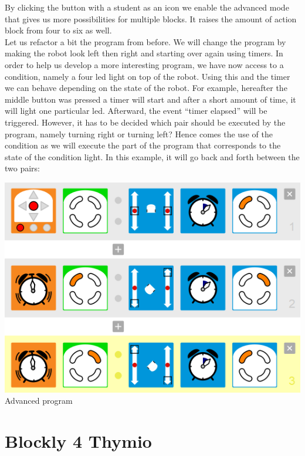 \documentclass{scrreprt}
\begin{document}
By clicking the button with a student as an icon we enable the advanced mode that gives us more possibilities for multiple blocks. It raises the amount of action block from four to six as well. \\

Let us refactor a bit the program from before. We will change the program by making the robot look left then right and starting over again using timers. 
In order to help us develop a more interesting program, we have now access to a condition, namely a four led light on top of the robot. Using this and the timer we can behave depending on the state of the robot. 
For example, hereafter the middle button was pressed a timer will start and after a short amount of time, it will light one particular led. 
Afterward, the event “timer elapsed” will be triggered. However, it has to be decided which pair should be executed by the program, namely turning right or turning left? 
Hence comes the use of the condition as we will execute the part of the program that corresponds to the state of the condition light. 
In this example, it will go back and forth between the two pairs: \\
\begin{center}
  \includegraphics[scale=0.5]{./VPL/middlebtn_3E_adv}\\
  Advanced program
\end{center}

\section{Blockly 4 Thymio}
\end{document}
